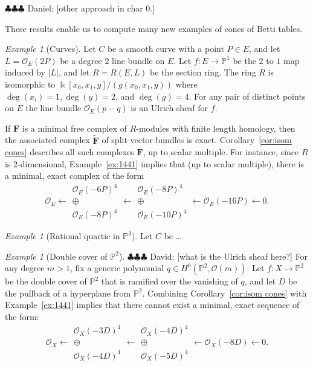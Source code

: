 \documentclass[12pt]{amsart}
\theoremstyle{definition}
\theoremstyle{remark}
\newtheorem{example}[lemma]{Example}
\newcommand{\kk}{\Bbbk}
\newcommand{\PP}{\mathbb{P}}
\newcommand{\cO}{\mathcal{O}}
\newcommand{\FF}{\mathbf{F}}
\newcommand{\daniel}[1]{{\color{green} \sf $\clubsuit\clubsuit\clubsuit$ Daniel: [#1]}}
\newcommand{\david}[1]{{\color{red} \sf $\clubsuit\clubsuit\clubsuit$ David: [#1]}}
\begin{document}
\daniel{other approach in char 0.}

These results enable us to compute many new examples of cones of Betti tables.

\begin{example}[Curves]\label{ex:res over section ring of ell curve}
Let $C$ be a smooth curve with a point $P\in E$, and let $L=\cO_{E}(2P)$ be a degree $2$ line bundle on $E$.   Let $f\colon E\to \PP^1$ be the $2$ to $1$ map induced by $|L|$, and let $R=R(E,L)$ be the section ring.  The ring $R$ is isomorphic to $\kk[x_0,x_1,y]/(g(x_0,x_1,y))$ where $\deg(x_i)=1,\deg(y)=2$, and $\deg(g)=4$. 
For any pair of distinct points on $E$ the line bundle 
$\cO_{E}(p-q)$
is an Ulrich sheaf for $f$.

If $\FF$ is a minimal free complex of $R$-modules with finite length homology, then the associated complex $\widetilde{\FF}$ of split vector bundles is exact.  Corollary~\ref{cor:isom cones} describes all such complexes $\FF$, up to scalar multiple.
For instance, since $R$ is $2$-dimensional, Example~\ref{ex:1441} implies that (up to scalar multiple), there is a minimal, exact complex of the form
\[
\cO_E\longleftarrow \begin{matrix}  \cO_E(-6P)^4\\ \oplus\\ \cO_E(-8P)^4\end{matrix}\longleftarrow \begin{matrix}  \cO_E(-8P)^4\\ \oplus\\ \cO_E(-10P)^4\end{matrix} \longleftarrow \cO_E(-16P)\longleftarrow 0.
\]
\end{example}

\begin{example}[Rational quartic in $\PP^3$]
Let $C$ be \dots
\end{example}




\begin{example}[Double cover of $\PP^2$] \david{what is the Ulrich sheaf here?}
For any degree $m>1$, fix a generic polynomial $q\in H^0(\PP^2, \cO(m))$.  Let $f\colon X\to\PP^2$ be the double cover of $\PP^2$ that is ramified over the vanishing of $q$, and let $D$ be the pullback of a hyperplane from $\PP^2$.  Combining Corollary~\ref{cor:isom cones} with Example~\ref{ex:1441} implies that there cannot exist a minimal, exact sequence of the form:
\[
\cO_X\longleftarrow \begin{matrix}  \cO_X(-3D)^4\\ \oplus\\ \cO_X(-4D)^4\end{matrix}\longleftarrow \begin{matrix}  \cO_X(-4D)^4\\ \oplus\\ \cO_X(-5D)^4\end{matrix} \longleftarrow \cO_X(-8D)\longleftarrow 0.
\]
\end{example}
\end{document}
